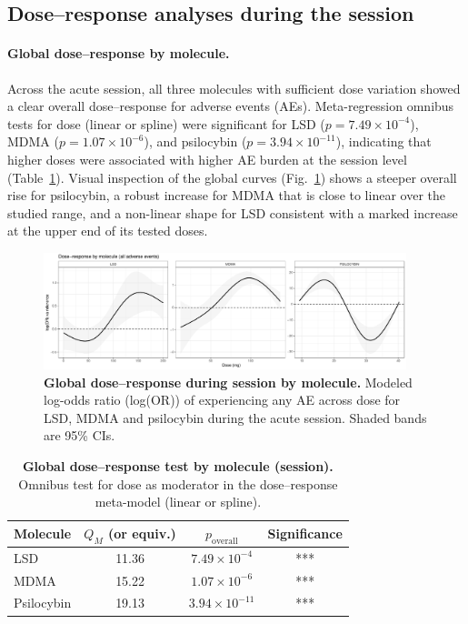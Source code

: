 \subsection{Dose–response analyses during the session}

\paragraph{Global dose–response by molecule.}
Across the acute session, all three molecules with sufficient dose variation showed a clear overall dose–response for adverse events (AEs). Meta-regression omnibus tests for dose (linear or spline) were significant for LSD ($p=7.49\times10^{-4}$), MDMA ($p=1.07\times10^{-6}$), and psilocybin ($p=3.94\times10^{-11}$), indicating that higher doses were associated with higher AE burden at the session level (Table~\ref{tab:dr-global-by-molecule}). Visual inspection of the global curves (Fig.~\ref{fig:dr-global-session}) shows a steeper overall rise for psilocybin, a robust increase for MDMA that is close to linear over the studied range, and a non-linear shape for LSD consistent with a marked increase at the upper end of its tested doses.

\begin{figure}[htb]
  \centering
  \includegraphics[width=0.94\textwidth]{figures/master_dr_by_molecule-session.pdf}
  \caption{\textbf{Global dose–response during session by molecule.}
  Modeled log-odds ratio (log(OR)) of experiencing any AE across dose for LSD, MDMA and psilocybin during the acute session. Shaded bands are 95\% CIs.}
  \label{fig:dr-global-session}
\end{figure}

\begin{table}[htb]
\centering
\caption{\textbf{Global dose–response test by molecule (session).}
Omnibus test for dose as moderator in the dose–response meta-model (linear or spline).}
\label{tab:dr-global-by-molecule}
\begin{tabular}{lccc}
\toprule
Molecule & $Q_M$ (or equiv.) & $p_\text{overall}$ & Significance \\
\midrule
LSD         & 11.36 & $7.49\times 10^{-4}$ & *** \\
MDMA        & 15.22 & $1.07\times 10^{-6}$ & *** \\
Psilocybin  & 19.13 & $3.94\times 10^{-11}$ & *** \\
\bottomrule
\end{tabular}
\end{table}

